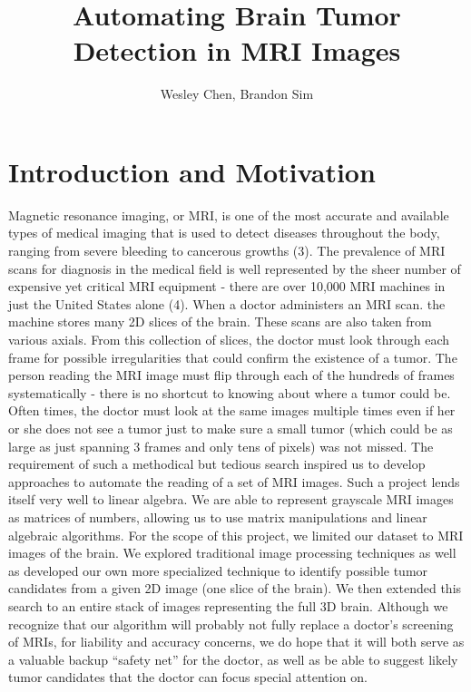 \documentclass[12pt]{article}
\theoremstyle{plain}%
\theoremstyle{definition}
\theoremstyle{remark}
\begin{document}
\title{Automating Brain Tumor Detection in MRI Images}
\author{Wesley Chen, Brandon Sim}

\maketitle
\tableofcontents
\newpage

\section{Introduction and Motivation}

Magnetic resonance imaging, or MRI, is one of the most accurate and available types of medical imaging that is used to detect diseases throughout the body, ranging from severe bleeding to cancerous growths (3).  The prevalence of MRI scans for diagnosis in the medical field is well represented by the sheer number of expensive yet critical MRI equipment - there are over 10,000 MRI machines in just the United States alone (4).  When a doctor administers an MRI scan. the machine stores many 2D slices of the brain. These scans are also taken from various axials. From this collection of slices, the doctor must look through each frame for possible irregularities that could confirm the existence of a tumor.  The person reading the MRI image must flip through each of the hundreds of frames systematically - there is no shortcut to knowing about where a tumor could be.  Often times, the doctor must look at the same images multiple times even if her or she does not see a tumor just to make sure a small tumor (which could be as large as just spanning 3 frames and only tens of pixels) was not missed.  The requirement of such a methodical but tedious search inspired us to develop approaches to automate the reading of a set of MRI images. Such a project lends itself very well to linear algebra. We are able to represent grayscale MRI images as matrices of numbers, allowing us to use matrix manipulations and linear algebraic algorithms. For the scope of this project, we limited our dataset to MRI images of the brain. We explored traditional image processing techniques as well as developed our own more specialized technique to identify possible tumor candidates from a given 2D image (one slice of the brain). We then extended this search to an entire stack of images representing the full 3D brain. Although we recognize that our algorithm will probably not fully replace a doctor's screening of MRIs, for liability and accuracy concerns, we do hope that it will both serve as a valuable backup ``safety net'' for the doctor, as well as be able to suggest likely tumor candidates that the doctor can focus special attention on.
\end{document}
